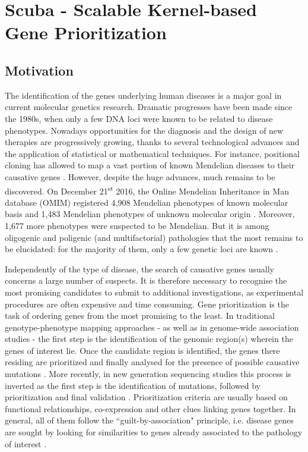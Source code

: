 \chapter{Scuba - Scalable Kernel-based Gene Prioritization}
\label{chap:scuba}
\section{Motivation}
The identification of the genes underlying human diseases is a major goal in current molecular genetics research. Dramatic progresses have been made since the 1980s, when only a few DNA loci were known to be related to disease phenotypes. Nowadays opportunities for the diagnosis and the design of new therapies are progressively growing, thanks to several technological advances and the application of statistical or mathematical techniques. For instance, positional cloning has allowed to map a vast portion of known Mendelian diseases to their causative genes \cite{strachan,botstein}. However, despite the huge advances, much remains to be discovered. On December 21\textsuperscript{st} 2016, the Online Mendelian Inheritance in Man database (OMIM) registered 4,908 Mendelian phenotypes of known molecular basis and 1,483 Mendelian phenotypes of unknown molecular origin \cite{omim}. Moreover, 1,677 more phenotypes were suspected to be Mendelian. But it is among oligogenic and poligenic (and multifactorial) pathologies that the most remains to be elucidated: for the majority of them, only a few genetic loci are known \cite{strachan,botstein}.

Independently of the type of disease, the search of causative genes usually concerns a large number of suspects. It is therefore necessary to recognise the most promising candidates to submit to additional investigations, as experimental procedures are often expensive and time consuming. Gene prioritization is the task of ordering genes from the most promising to the least. In traditional genotype-phenotype mapping approaches - as well as in genome-wide association studies - the first step is the identification of the genomic region(s) wherein the genes of interest lie. Once the candidate region is identified, the genes there residing are prioritized and finally analysed for the presence of possible causative mutations \cite{strachan}. More recently, in new generation sequencing studies this process is inverted as the first step is the identification of mutations, followed by prioritization and final validation \cite{salgado}. Prioritization criteria are usually based on functional relationships, co-expression and other clues linking genes together. In general, all of them follow the ``guilt-by-association" principle, i.e. disease genes are sought by looking for similarities to genes already associated to the pathology of interest \cite{strachan}.

